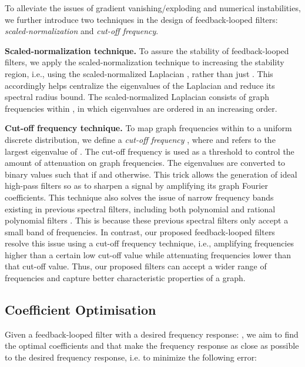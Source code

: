 \documentclass{article}
\begin{document}
To alleviate the issues of gradient vanishing/exploding and numerical instabilities, we further introduce two techniques in the design of feedback-looped filters: \emph{scaled-normalization} and \emph{cut-off frequency}. 

\noindent\textbf{Scaled-normalization technique. } To assure the stability of feedback-looped filters, we apply the scaled-normalization technique to increasing the stability region, i.e., using the scaled-normalized Laplacian , rather than just . This accordingly helps centralize the eigenvalues of the Laplacian  and reduce its spectral radius bound. The scaled-normalized Laplacian  consists of graph frequencies within , in which eigenvalues are ordered in an increasing order. 









\smallskip
\noindent\textbf{Cut-off frequency technique. } To map graph frequencies within  to a uniform discrete distribution, we define a \emph{cut-off frequency} , where  and  refers to the largest eigenvalue of . The cut-off frequency is used as a threshold to control the amount of attenuation on graph frequencies. The eigenvalues  are converted to binary values  such that  if  and  otherwise. This trick allows the generation of ideal high-pass filters so as to sharpen a signal by amplifying its graph Fourier coefficients. This technique also solves the issue of narrow frequency bands existing in previous spectral filters, including both polynomial and rational polynomial filters \cite{defferrard2016convolutional, levie2017cayleynets}. This is because these previous spectral filters only accept a small band of frequencies. In contrast, our proposed feedback-looped filters resolve this issue using a cut-off frequency technique, i.e., amplifying frequencies higher than a certain low cut-off value while attenuating frequencies lower than that cut-off value. Thus, our proposed filters can accept a wider range of frequencies and capture better characteristic properties of a graph.

 



\subsection{Coefficient Optimisation}
Given a feedback-looped filter with a desired frequency response: , we aim to find the optimal coefficients  and  that make the frequency response as close as possible to the desired frequency response, i.e. to minimize the following error:
\end{document}

